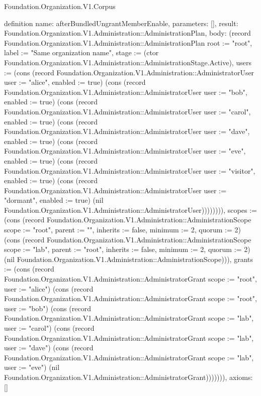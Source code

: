 \begin{lexlean}{Foundation.Organization.V1.Corpus}
\begin{semanticmodule}
definition{
  name: afterBundledUngrantMemberEnable,
  parameters: [],
  result: Foundation.Organization.V1.Administration::AdministrationPlan,
  body: (record Foundation.Organization.V1.Administration::AdministrationPlan {root := "root", label := "Same organization name", stage := (ctor Foundation.Organization.V1.Administration::AdministrationStage.Active), users := (cons (record Foundation.Organization.V1.Administration::AdministratorUser {user := "alice", enabled := true}) (cons (record Foundation.Organization.V1.Administration::AdministratorUser {user := "bob", enabled := true}) (cons (record Foundation.Organization.V1.Administration::AdministratorUser {user := "carol", enabled := true}) (cons (record Foundation.Organization.V1.Administration::AdministratorUser {user := "dave", enabled := true}) (cons (record Foundation.Organization.V1.Administration::AdministratorUser {user := "eve", enabled := true}) (cons (record Foundation.Organization.V1.Administration::AdministratorUser {user := "visitor", enabled := true}) (cons (record Foundation.Organization.V1.Administration::AdministratorUser {user := "dormant", enabled := true}) (nil Foundation.Organization.V1.Administration::AdministratorUser)))))))), scopes := (cons (record Foundation.Organization.V1.Administration::AdministrationScope {scope := "root", parent := "", inherits := false, minimum := 2, quorum := 2}) (cons (record Foundation.Organization.V1.Administration::AdministrationScope {scope := "lab", parent := "root", inherits := false, minimum := 2, quorum := 2}) (nil Foundation.Organization.V1.Administration::AdministrationScope))), grants := (cons (record Foundation.Organization.V1.Administration::AdministratorGrant {scope := "root", user := "alice"}) (cons (record Foundation.Organization.V1.Administration::AdministratorGrant {scope := "root", user := "bob"}) (cons (record Foundation.Organization.V1.Administration::AdministratorGrant {scope := "lab", user := "carol"}) (cons (record Foundation.Organization.V1.Administration::AdministratorGrant {scope := "lab", user := "dave"}) (cons (record Foundation.Organization.V1.Administration::AdministratorGrant {scope := "lab", user := "eve"}) (nil Foundation.Organization.V1.Administration::AdministratorGrant))))))}),
  axioms: []
}


\end{semanticmodule}
\end{lexlean}
